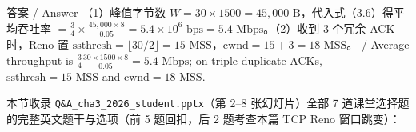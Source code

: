\begin{StudySolution}{答案 / Answer}
（1）峰值字节数 $W = 30\times 1500 = 45{,}000\text{ B}$，代入式（3.6）得平均吞吐率 $= \frac{3}{4}\times \frac{45{,}000\times 8}{0.05} = 5.4\times 10^6\text{ bps} = 5.4\text{ Mbps}$。（2）收到 3 个冗余 ACK 时，Reno 置 $\mathrm{ssthresh} = \lfloor 30/2\rfloor = 15\text{ MSS}$，$\mathrm{cwnd} = 15 + 3 = 18\text{ MSS}$。 / Average throughput is $\frac{3}{4}\frac{30\times 1500\times 8}{0.05} = 5.4\text{ Mbps}$; on triple duplicate ACKs, $\mathrm{ssthresh}=15\text{ MSS}$ and $\mathrm{cwnd}=18\text{ MSS}$.
\end{StudySolution}



本节收录 \texttt{Q\&A\_cha3\_2026\_student.pptx}（第 2–8 张幻灯片）全部 7 道课堂选择题的完整英文题干与选项（前 5 题回扣，后 2 题考查本篇 TCP Reno 窗口跳变）：

